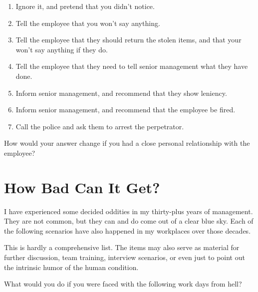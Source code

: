 \begin{enumerate}
\item Ignore it, and pretend that you didn't notice.
\item Tell the employee that you won't say anything.
\item Tell the employee that they should return the stolen items, and that your won't say anything if they do.
\item Tell the employee that they need to tell senior management what they have done.
\item Inform senior management, and recommend that they show leniency.
\item Inform senior management, and recommend that the employee be fired.
\item Call the police and ask them to arrest the perpetrator.
\end{enumerate}

How would your answer change if you had a close personal relationship with the employee?


\section{How Bad Can It Get?}

I have experienced some decided oddities in my thirty-plus years of management. They are not common, but they can and do come out of a clear blue sky. Each of the following scenarios have also happened in my workplaces over those decades.

This is hardly a comprehensive list. The items may also serve as material for further discussion, team training, interview scenarios, or even just to point out the intrinsic humor of the human condition.

What would you do if you were faced with the following work days from hell?


